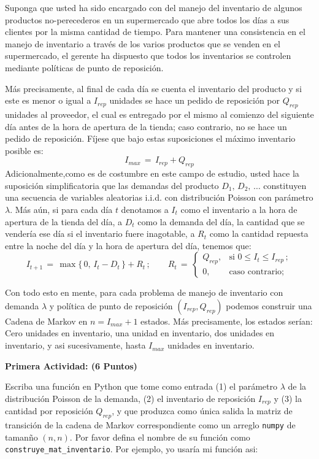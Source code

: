 \documentclass[ a4paper, twoside, 11pt]{article}
\begin{document}
\begin{problem}
Suponga que usted ha sido encargado con del manejo del inventario de algunos productos no-perecederos en un supermercado que abre todos los d\'ias a sus clientes por la misma cantidad de tiempo. Para mantener una consistencia en el manejo de inventario a trav\'es de los varios productos que se venden en el supermercado, el gerente ha dispuesto que todos los inventarios se controlen mediante pol\'iticas de punto de reposici\'on. 

M\'as precisamente, al final de cada d\'ia se cuenta el inventario del producto y si este es menor o igual a $I_{rep}$ unidades se hace un pedido de reposici\'on por $Q_{rep}$ unidades al proveedor, el cual es entregado por el mismo al comienzo del siguiente d\'ia antes de la hora de apertura de la tienda; caso contrario, no se hace un pedido de reposici\'on. F\'ijese que bajo estas suposiciones el m\'aximo inventario posible es:
\[
I_{max} \, = \, I_{rep} + Q_{rep}
\]
Adicionalmente,como es de costumbre en este campo de estudio, usted hace la suposici\'on simplificatoria que las demandas del producto $D_1, \, D_2, \, \dots$ constituyen una secuencia de variables aleatorias i.i.d. con distribuci\'on Poisson con par\'ametro $\lambda$. M\'as a\'un, si para cada d\'ia $t$ denotamos a $I_t$ como el inventario a la hora de apertura de la tienda del \tavo d\'ia, a $D_t$ como la demanda del d\'ia, \ie la cantidad que se vender\'ia ese d\'ia si el inventario fuere inagotable, a $R_t$ como la cantidad repuesta entre la noche del \tavo d\'ia y la hora de apertura del \tMavo d\'ia, tenemos que:
\[
I_{t+1} \, = \, \max \{ \, 0, \, I_t - D_t \, \} + R_t \, ; \qquad
R_t \, = \, 
\begin{cases}
Q_{rep}, & \text{si } 0 \leq I_t \leq I_{rep} \, ; \\
0, & \text{caso contrario;}
\end{cases}
\]

Con todo esto en mente, para cada problema de manejo de inventario con demanda $\lambda$ y pol\'itica de punto de reposici\'on $(I_{rep},Q_{rep})$ podemos construir una Cadena de Markov en $n = I_{max} + 1$ estados. M\'as precisamente, los estados ser\'ian: Cero unidades en inventario, una unidad en inventario, dos unidades en inventario, y asi sucesivamente, hasta $I_{max}$ unidades en inventario. 

\textbf{Primera Actividad: (6 Puntos)}

Escriba una funci\'on en Python que tome como entrada (1) el par\'ametro $\lambda$ de la distribuci\'on Poisson de la demanda, (2) el inventario de reposici\'on $I_{rep}$ y (3) la cantidad por reposici\'on $Q_{rep}$, \linebreak y que produzca como \'unica salida la matriz de transici\'on de la cadena de Markov correspondiente como un arreglo {\tt numpy} de taman\~no $(n,n)$. Por favor defina el nombre de su funci\'on como {\tt construye\_mat\_inventario}. Por ejemplo, yo usar\'ia mi funci\'on asi:
\halfskip


\end{problem}
\end{document}
